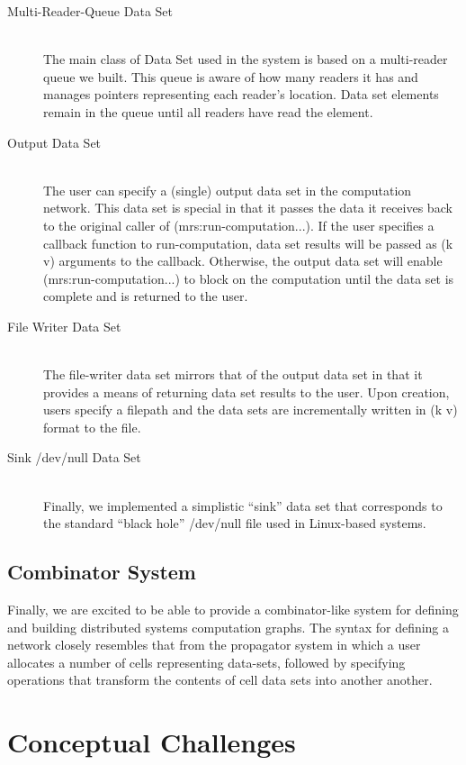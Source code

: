 \documentclass{article}
\begin{document}
\begin{description}

\item[Multi-Reader-Queue Data Set] \hfill \\
The main class of Data Set used in the system is based on a
multi-reader queue we built. This queue is aware of how many readers
it has and manages pointers representing each reader's location. Data
set elements remain in the queue until all readers have read the
element. 

\item[Output Data Set] \hfill \\
The user can specify a (single) output data set in the computation
network. This data set is special in that it passes the data it
receives back to the original caller of (mrs:run-computation...). If
the user specifies a callback function to run-computation, data set
results will be passed as (k v) arguments to the callback. Otherwise,
the output data set will enable (mrs:run-computation...) to block on
the computation until the data set is complete and is returned to the user.

\item[File Writer Data Set] \hfill \\
The file-writer data set mirrors that of the output data set in that
it provides a means of returning data set results to the user. Upon
creation, users specify a filepath and the data sets are incrementally
written in (k v) format to the file.

\item[Sink /dev/null Data Set] \hfill \\
Finally, we implemented a simplistic ``sink'' data set that
corresponds to the standard ``black hole'' /dev/null file used in
Linux-based systems.
\end{description}
\subsection{Combinator System}

Finally, we are excited to be able to provide a combinator-like system
for defining and building distributed systems computation graphs. The
syntax for defining a network closely resembles that from the
propagator system in which a user allocates a number of cells
representing data-sets, followed by specifying operations that
transform the contents of cell data sets into another another.

\section{Conceptual Challenges}
\end{document}
